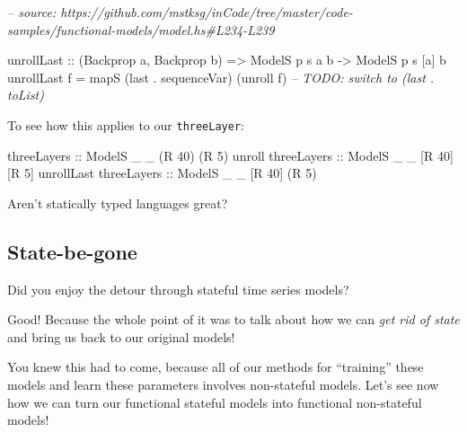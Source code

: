 \documentclass[]{article}
\newenvironment{Shaded}{}{}
\newcommand{\CommentTok}[1]{\textcolor[rgb]{0.38,0.63,0.69}{\textit{#1}}}
\newcommand{\DataTypeTok}[1]{\textcolor[rgb]{0.56,0.13,0.00}{#1}}
\newcommand{\DecValTok}[1]{\textcolor[rgb]{0.25,0.63,0.44}{#1}}
\newcommand{\FunctionTok}[1]{\textcolor[rgb]{0.02,0.16,0.49}{#1}}
\newcommand{\NormalTok}[1]{#1}
\newcommand{\OtherTok}[1]{\textcolor[rgb]{0.00,0.44,0.13}{#1}}
\begin{document}
\begin{Shaded}
\begin{Highlighting}[]
\CommentTok{-- source: https://github.com/mstksg/inCode/tree/master/code-samples/functional-models/model.hs#L234-L239}

\NormalTok{unrollLast}
\OtherTok{    ::}\NormalTok{ (}\DataTypeTok{Backprop}\NormalTok{ a, }\DataTypeTok{Backprop}\NormalTok{ b)}
    \OtherTok{=>} \DataTypeTok{ModelS}\NormalTok{ p s  a  b}
    \OtherTok{->} \DataTypeTok{ModelS}\NormalTok{ p s [a] b}
\NormalTok{unrollLast f }\FunctionTok{=}\NormalTok{ mapS (last }\FunctionTok{.}\NormalTok{ sequenceVar) (unroll f)}
\CommentTok{-- TODO: switch to (last . toList)}
\end{Highlighting}
\end{Shaded}

To see how this applies to our \texttt{threeLayer}:

\begin{Shaded}
\begin{Highlighting}[]
\OtherTok{threeLayers            ::} \DataTypeTok{ModelS}\NormalTok{ _ _ (}\DataTypeTok{R} \DecValTok{40}\NormalTok{) (}\DataTypeTok{R} \DecValTok{5}\NormalTok{)}
\NormalTok{unroll}\OtherTok{ threeLayers     ::} \DataTypeTok{ModelS}\NormalTok{ _ _ [}\DataTypeTok{R} \DecValTok{40}\NormalTok{] [}\DataTypeTok{R} \DecValTok{5}\NormalTok{]}
\NormalTok{unrollLast}\OtherTok{ threeLayers ::} \DataTypeTok{ModelS}\NormalTok{ _ _ [}\DataTypeTok{R} \DecValTok{40}\NormalTok{] (}\DataTypeTok{R} \DecValTok{5}\NormalTok{)}
\end{Highlighting}
\end{Shaded}

Aren't statically typed languages great?

\hypertarget{state-be-gone}{%
\subsection{State-be-gone}\label{state-be-gone}}

Did you enjoy the detour through stateful time series models?

Good! Because the whole point of it was to talk about how we can \emph{get rid
of state} and bring us back to our original models!

You knew this had to come, because all of our methods for ``training'' these
models and learn these parameters involves non-stateful models. Let's see now
how we can turn our functional stateful models into functional non-stateful
models!
\end{document}
